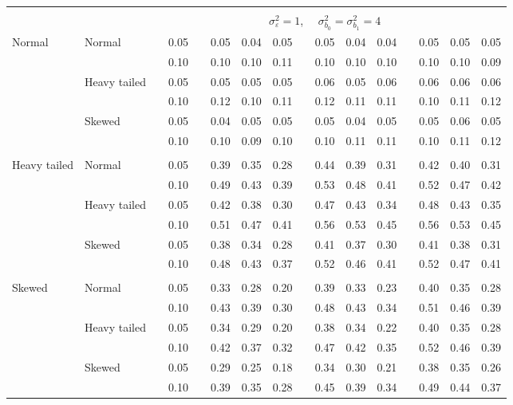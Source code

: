 \documentclass[12pt]{article} %
\begin{document}
\begin{table}[ht]
\begin{scriptsize}
\begin{center}
\begin{tabular}{ll p{.1cm} c p{.1cm} rrr p{.1cm} rrr p{.1cm} rrr}
&&&&&&&&&&&&&&&\\
& && && \multicolumn{9}{c}{$\sigma_{\varepsilon}^2 = 1$, \ \ $\sigma_{b_0}^2 = \sigma_{b_1}^2 = 4$} \\ \cline{6-16}
\rowcolor{gray!20}Normal       & Normal       && 0.05 &&   0.05 & 0.04 & 0.05 && 0.05 & 0.04 & 0.04 && 0.05 & 0.05 & 0.05 \\ 
\rowcolor{gray!20}             &              && 0.10 &&   0.10 & 0.10 & 0.11 && 0.10 & 0.10 & 0.10 && 0.10 & 0.10 & 0.09 \\ 
\rowcolor{gray!20}             & Heavy tailed && 0.05 &&   0.05 & 0.05 & 0.05 && 0.06 & 0.05 & 0.06 && 0.06 & 0.06 & 0.06 \\ 
\rowcolor{gray!20}             &              && 0.10 &&   0.12 & 0.10 & 0.11 && 0.12 & 0.11 & 0.11 && 0.10 & 0.11 & 0.12 \\ 
\rowcolor{gray!20}             & Skewed       && 0.05 &&   0.04 & 0.05 & 0.05 && 0.05 & 0.04 & 0.05 && 0.05 & 0.06 & 0.05 \\ 
\rowcolor{gray!20}             &              && 0.10 &&   0.10 & 0.09 & 0.10 && 0.10 & 0.11 & 0.11 && 0.10 & 0.11 & 0.12 \\ 
             &&&&&&&&&&&&&&&\\
Heavy tailed & Normal       && 0.05 &&   0.39 & 0.35 & 0.28 && 0.44 & 0.39 & 0.31 && 0.42 & 0.40 & 0.31 \\ 
             &              && 0.10 &&   0.49 & 0.43 & 0.39 && 0.53 & 0.48 & 0.41 && 0.52 & 0.47 & 0.42 \\ 
             & Heavy tailed && 0.05 &&   0.42 & 0.38 & 0.30 && 0.47 & 0.43 & 0.34 && 0.48 & 0.43 & 0.35 \\ 
             &              && 0.10 &&   0.51 & 0.47 & 0.41 && 0.56 & 0.53 & 0.45 && 0.56 & 0.53 & 0.45 \\ 
             & Skewed       && 0.05 &&   0.38 & 0.34 & 0.28 && 0.41 & 0.37 & 0.30 && 0.41 & 0.38 & 0.31 \\ 
             &              && 0.10 &&   0.48 & 0.43 & 0.37 && 0.52 & 0.46 & 0.41 && 0.52 & 0.47 & 0.41 \\ 
             &&&&&&&&&&&&&&&\\
Skewed       & Normal       && 0.05 &&   0.33 & 0.28 & 0.20 && 0.39 & 0.33 & 0.23 && 0.40 & 0.35 & 0.28 \\  
             &              && 0.10 &&   0.43 & 0.39 & 0.30 && 0.48 & 0.43 & 0.34 && 0.51 & 0.46 & 0.39 \\  
             & Heavy tailed && 0.05 &&   0.34 & 0.29 & 0.20 && 0.38 & 0.34 & 0.22 && 0.40 & 0.35 & 0.28 \\  
             &              && 0.10 &&   0.42 & 0.37 & 0.32 && 0.47 & 0.42 & 0.35 && 0.52 & 0.46 & 0.39 \\  
             & Skewed       && 0.05 &&   0.29 & 0.25 & 0.18 && 0.34 & 0.30 & 0.21 && 0.38 & 0.35 & 0.26 \\  
             &              && 0.10 &&   0.39 & 0.35 & 0.28 && 0.45 & 0.39 & 0.34 && 0.49 & 0.44 & 0.37 \\  



\end{tabular}
\end{center}
\end{scriptsize}
\end{table}
\end{document}
